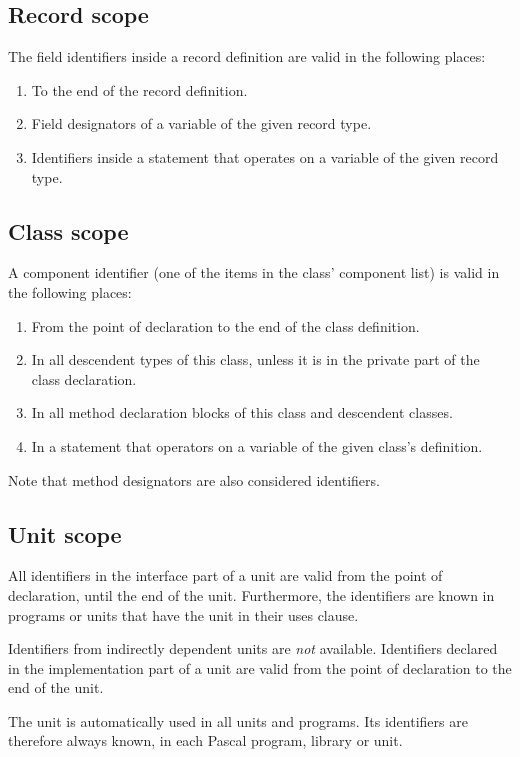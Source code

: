 \subsection{Record scope}
The field identifiers inside a record definition are valid in the following
places:
\begin{enumerate}
\item To the end of the record definition.
\item Field designators of a variable of the given record type.
\item Identifiers inside a  statement that operates on a variable
of the given record type.
\end{enumerate}

\subsection{Class scope}
A component identifier (one of the items in the class' component list)
is valid in the following places:
\begin{enumerate}
\item From the point of declaration to the end of the class definition.
\item In all descendent types of this class, unless it is in the private
part of the class declaration.
\item In all method declaration blocks of this class and descendent classes.
\item In a  statement that operators on a variable of the given class's
definition.
\end{enumerate}
Note that method designators are also considered identifiers.
\subsection{Unit scope}
All identifiers in the interface part of a unit are valid from the point of
declaration, until the end of the unit. Furthermore, the identifiers are
known in programs or units that have the unit in their uses clause.

Identifiers from indirectly dependent units are {\em not} available.
Identifiers declared in the implementation part of a unit are valid from the
point of declaration to the end of the unit.

The  unit is automatically used in all units and programs.
Its identifiers are therefore always known, in each Pascal program, library
or unit.

